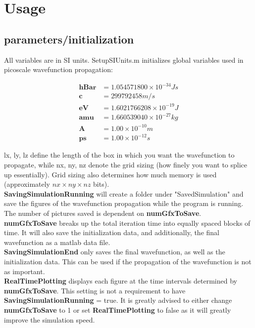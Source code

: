 \documentclass[11pt,letterpaper]{article}
\begin{document}
\section{Usage}

\subsection{parameters/initialization} 

All variables are in SI units. SetupSIUnits.m initializes global variables used in picoscale wavefunction propagation:

\begin{align*}
    \textbf{hBar} &= 1.054571800 \times 10^{-34} Js\\
    \textbf{c} &= 299792458 m/s\\
    \textbf{eV} &= 1.6021766208 \times 10^{-19} J\\
    \textbf{amu} &=  1.660539040 \times 10^{-27} kg\\
    \textbf{A} &= 1.00 \times 10^{-10} m\\
    \textbf{ps} &= 1.00 \times 10^{-12} s
\end{align*}

lx, ly, lz define the length of the box in which you want the wavefunction to propagate, while nx, ny, nz denote the grid sizing (how finely you want to splice up essentially). Grid sizing also determines how much memory is used (approximately $nx \times ny \times nz$ bits).\\

\textbf{SavingSimulationRunning} will create a folder under "SavedSimulation" and save the figures of the wavefunction propagation while the program is running. The number of pictures saved is dependent on \textbf{numGfxToSave}. \textbf{numGfxToSave} breaks up the total iteration time into equally spaced blocks of time. It will also save the initialization data, and additionally, the final wavefunction as a matlab data file.\\

\textbf{SavingSimulationEnd} only saves the final wavefunction, as well as the initialization data. This can be used if the propagation of the wavefunction is not as important.\\

\textbf{RealTimePlotting} displays each figure at the time intervals determined by \textbf{numGfxToSave}. This setting is not a requirement to have \textbf{SavingSimulationRunning} = true. It is greatly advised to either change \textbf{numGfxToSave} to 1 or set \textbf{RealTimePlotting} to false as it will greatly improve the simulation speed.\\
\end{document}

